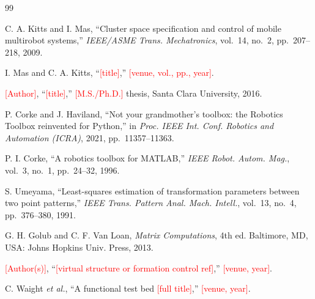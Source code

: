 \documentclass[conference]{IEEEtran}
\newcommand{\fillnote}[1]{\textcolor{red}{[#1]}} %
\begin{document}
\begin{thebibliography}{99}

C. A. Kitts and I. Mas, ``Cluster space specification and control of mobile
multirobot systems,'' \emph{IEEE/ASME Trans. Mechatronics}, vol.~14, no.~2,
pp.~207--218, 2009.

I. Mas and C. A. Kitts, ``\fillnote{title},'' \fillnote{venue, vol., pp., year}.

\fillnote{Author}, ``\fillnote{title},'' \fillnote{M.S./Ph.D.} thesis, Santa
Clara University, 2016.

P. Corke and J. Haviland, ``Not your grandmother's toolbox: the Robotics Toolbox
reinvented for Python,'' in \emph{Proc. IEEE Int. Conf. Robotics and Automation
(ICRA)}, 2021, pp.~11357--11363.

P. I. Corke, ``A robotics toolbox for MATLAB,'' \emph{IEEE Robot. Autom. Mag.},
vol.~3, no.~1, pp.~24--32, 1996.

S. Umeyama, ``Least-squares estimation of transformation parameters between two
point patterns,'' \emph{IEEE Trans. Pattern Anal. Mach. Intell.}, vol.~13, no.~4,
pp.~376--380, 1991.

G. H. Golub and C. F. Van Loan, \emph{Matrix Computations}, 4th ed. Baltimore,
MD, USA: Johns Hopkins Univ. Press, 2013.

\fillnote{Author(s)}, ``\fillnote{virtual structure or formation control ref},''
\fillnote{venue, year}.

C. Waight \emph{et al.}, ``A functional test bed \fillnote{full title},''
\fillnote{venue, year}.

\end{thebibliography}
\end{document}
